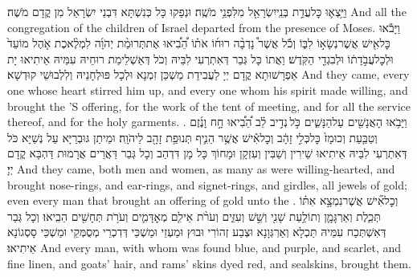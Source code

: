 {וַיֵּ֥צְא֛וּ כׇּל\maqqaf עֲדַ֥ת בְּנֵֽי\maqqaf יִשְׂרָאֵ֖ל מִלִּפְנֵ֥י מֹשֶֽׁה׃}
{וּנְפַקוּ כָּל כְּנִשְׁתָּא דִּבְנֵי יִשְׂרָאֵל מִן קֳדָם מֹשֶׁה׃}
{And all the congregation of the children of Israel departed from the presence of Moses.}{}
{וַיָּבֹ֕אוּ כׇּל\maqqaf אִ֖ישׁ אֲשֶׁר\maqqaf נְשָׂא֣וֹ לִבּ֑וֹ וְכֹ֡ל אֲשֶׁר֩ נָדְבָ֨ה רוּח֜וֹ אֹת֗וֹ הֵ֠בִ֠יאוּ אֶת\maqqaf תְּרוּמַ֨ת יְהֹוָ֜ה לִמְלֶ֨אכֶת אֹ֤הֶל מוֹעֵד֙ וּלְכׇל\maqqaf עֲבֹ֣דָת֔וֹ וּלְבִגְדֵ֖י הַקֹּֽדֶשׁ׃}
{וַאֲתוֹ כָּל גְּבַר דְּאִתְרְעִי לִבֵּיהּ וְכֹל דְּאַשְׁלֵימַת רוּחֵיהּ עִמֵּיהּ אֵיתִיאוּ יָת אַפְרָשׁוּתָא קֳדָם יְיָ לַעֲבִידַת מַשְׁכַּן זִמְנָא וּלְכָל פּוּלְחָנֵיהּ וְלִלְבוּשֵׁי קוּדְשָׁא׃}
{And they came, every one whose heart stirred him up, and every one whom his spirit made willing, and brought the \lord’S offering, for the work of the tent of meeting, and for all the service thereof, and for the holy garments. .}{}
{וַיָּבֹ֥אוּ הָאֲנָשִׁ֖ים עַל\maqqaf הַנָּשִׁ֑ים כֹּ֣ל \legarmeh  נְדִ֣יב לֵ֗ב הֵ֠בִ֠יאוּ חָ֣ח וָנֶ֜זֶם וְטַבַּ֤עַת וְכוּמָז֙ כׇּל\maqqaf כְּלִ֣י זָהָ֔ב וְכׇל\maqqaf אִ֕ישׁ אֲשֶׁ֥ר הֵנִ֛יף תְּנוּפַ֥ת זָהָ֖ב לַיהֹוָֽה׃}
{וּמֵיתַן גּוּבְרַיָּא עַל נְשַׁיָּא כֹּל דְּאִתְרְעִי לִבֵּיהּ אֵיתִיאוּ שֵׁירִין וְשַׁבִּין וְעִזְקָן וּמָחוֹךְ כָּל מָן דִּדְהַב וְכָל גְּבַר דַּאֲרֵים אֲרָמוּת דַּהְבָּא קֳדָם יְיָ׃}
{And they came, both men and women, as many as were willing-hearted, and brought nose-rings, and ear-rings, and signet-rings, and girdles, all jewels of gold; even every man that brought an offering of gold unto the \lord.}{}
{וְכׇל\maqqaf אִ֞ישׁ אֲשֶׁר\maqqaf נִמְצָ֣א אִתּ֗וֹ תְּכֵ֧לֶת וְאַרְגָּמָ֛ן וְתוֹלַ֥עַת שָׁנִ֖י וְשֵׁ֣שׁ וְעִזִּ֑ים וְעֹרֹ֨ת אֵילִ֧ם מְאׇדָּמִ֛ים וְעֹרֹ֥ת תְּחָשִׁ֖ים הֵבִֽיאוּ׃}
{וְכָל גְּבַר דְּאִשְׁתְּכַח עִמֵּיהּ תַּכְלָא וְאַרְגְּוָנָא וּצְבַע זְהוֹרִי וּבוּץ וּמַעְזֵי וּמַשְׁכֵּי דְּדִכְרֵי מְסֻמְּקֵי וּמַשְׁכֵּי סָסְגוֹנָא אֵיתִיאוּ׃}
{And every man, with whom was found blue, and purple, and scarlet, and fine linen, and goats’ hair, and rams’ skins dyed red, and sealskins, brought them.}{}
